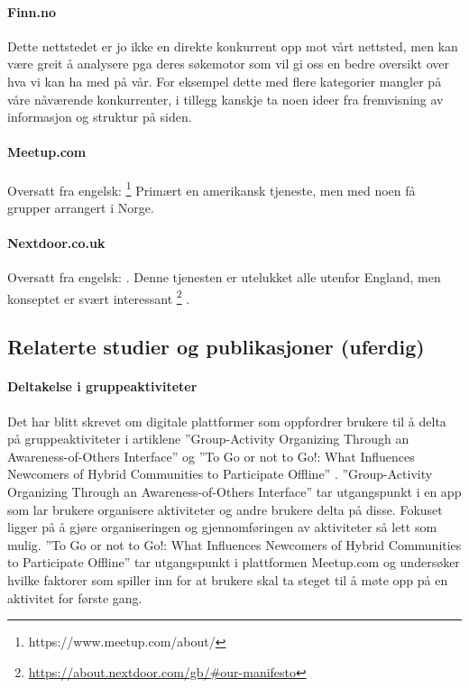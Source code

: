 \paragraph{Finn.no}
Dette nettstedet er jo ikke en direkte konkurrent opp mot vårt nettsted, men kan være greit å analysere pga deres søkemotor som vil gi oss en bedre oversikt over hva vi kan ha med på vår. For eksempel dette med flere kategorier mangler på våre nåværende konkurrenter, i tillegg kanskje ta noen ideer fra fremvisning av informasjon og struktur på siden.

\paragraph{Meetup.com}
Oversatt fra engelsk:
  \footnote{https://www.meetup.com/about/} Primært en amerikansk tjeneste, men med noen få grupper arrangert i Norge.


\paragraph{Nextdoor.co.uk}
Oversatt fra engelsk:
. Denne tjenesten er utelukket alle utenfor England, men konseptet er svært interessant \footnote{\url{https://about.nextdoor.com/gb/\#our-manifesto}} .

\subsection{Relaterte studier og publikasjoner (uferdig)}

\paragraph{Deltakelse i gruppeaktiviteter}
Det har blitt skrevet om digitale plattformer som oppfordrer brukere til å delta på gruppeaktiviteter i artiklene ''Group-Activity Organizing Through an Awareness-of-Others Interface'' \cite{AWARENESS:3:CSCW18} og ''To Go or not to Go!: What Influences Newcomers of Hybrid Communities to Participate Offline'' \cite{NEWCOMERS:4:CT17}. ''Group-Activity Organizing Through an Awareness-of-Others Interface'' tar utgangspunkt i en app som lar brukere organisere aktiviteter og andre brukere delta på disse. Fokuset ligger på å gjøre organiseringen og gjennomføringen av aktiviteter så lett som mulig. ''To Go or not to Go!: What Influences Newcomers of Hybrid Communities to Participate Offline'' tar utgangspunkt i plattformen Meetup.com og undersøker hvilke faktorer som spiller inn for at brukere skal ta steget til å møte opp på en aktivitet for første gang.

